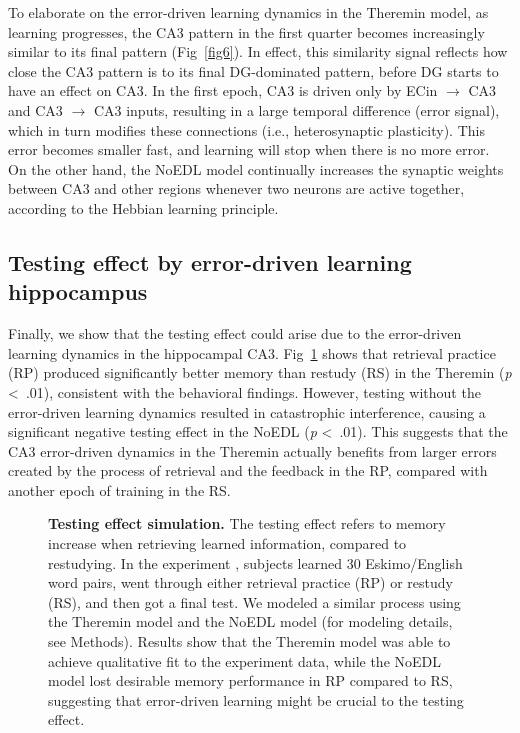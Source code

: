 \documentclass[10pt,letterpaper]{article}
\begin{document}
To elaborate on the error-driven learning dynamics in the Theremin model, as learning progresses, the CA3 pattern in the first quarter becomes increasingly similar to its final pattern (Fig~\ref{fig6}). In effect, this similarity signal reflects how close the CA3 pattern is to its final DG-dominated pattern, before DG starts to have an effect on CA3. In the first epoch, CA3 is driven only by ECin $\rightarrow$ CA3 and CA3 $\rightarrow$ CA3 inputs, resulting in a large temporal difference (error signal), which in turn modifies these connections (i.e., heterosynaptic plasticity). This error becomes smaller fast, and learning will stop when there is no more error.  On the other hand, the NoEDL model continually increases the synaptic weights between CA3 and other regions whenever two neurons are active together, according to the Hebbian learning principle.

\subsection*{Testing effect by error-driven learning hippocampus}

Finally, we show that the testing effect could arise due to the error-driven learning dynamics in the hippocampal CA3.  Fig~\ref{fig7} shows that retrieval practice (RP) produced significantly better memory than restudy (RS) in the Theremin (\emph{p} \textless \ .01), consistent with the behavioral findings.  However, testing without the error-driven learning dynamics resulted in catastrophic interference, causing a significant negative testing effect in the NoEDL (\emph{p} \textless \ .01).  This suggests that the CA3 error-driven dynamics in the Theremin actually benefits from larger errors created by the process of retrieval and the feedback in the RP, compared with another epoch of training in the RS.  

\begin{figure}[!h]
  \caption{{\bf Testing effect simulation.}
  The testing effect refers to memory increase when retrieving learned information, compared to restudying.  In the experiment \cite{CarrierPashler92}, subjects learned 30 Eskimo/English word pairs, went through either retrieval practice (RP) or restudy (RS), and then got a final test.  We modeled a similar process using the Theremin model and the NoEDL model (for modeling details, see Methods).  Results show that the Theremin model was able to achieve qualitative fit to the experiment data, while the NoEDL model lost desirable memory performance in RP compared to RS, suggesting that error-driven learning might be crucial to the testing effect.}
\label{fig7}
\end{figure}
\end{document}

